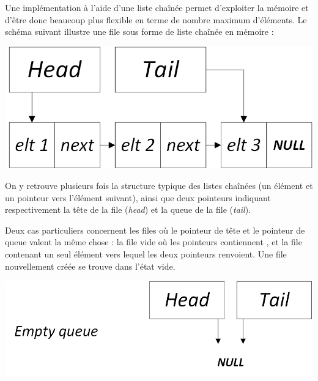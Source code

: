 \documentclass[11pt,a4paper]{article}
\begin{document}
\bigskip

Une implémentation à l'aide d'une liste chaînée permet d'exploiter la mémoire et d'être donc beaucoup plus flexible en terme de nombre maximum d'éléments.
Le schéma suivant illustre une file sous forme de liste chaînée en mémoire :\\

\begin{center}
\includegraphics[scale=0.75]{img/files/Files_3_Liste_Chainee_Structure_cas_general.png}
\end{center}

\smallskip

On y retrouve plusieurs fois la structure typique des listes chaînées (un élément et un pointeur vers l'élément suivant), ainsi que deux pointeurs indiquant respectivement la tête de la file (\textit{head}) et la queue de la file (\textit{tail}).

Deux cas particuliers concernent les files où le pointeur de tête et le pointeur de queue valent la même chose : la file vide où les pointeurs contiennent , et la file contenant un seul élément vers lequel les deux pointeurs renvoient.
Une file nouvellement créée se trouve dans l'état vide.\\

\begin{center}
\includegraphics[scale=0.75]{img/files/Files_3_Liste_Chainee_Structure_cas_vide_etiquette.png}
\end{center}
\end{document}
